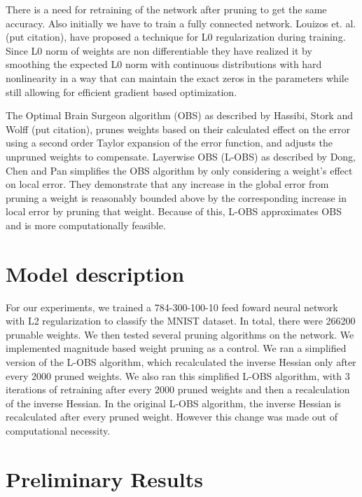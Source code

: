\documentclass{article}
\begin{document}
There is a need for retraining of the network after pruning to get the same accuracy. Also initially we have to train a fully connected network. Louizos et. al.(put citation), have proposed a technique for L0 regularization during training. Since L0 norm of weights are non differentiable they have realized it by smoothing the expected L0 norm with continuous distributions with hard nonlinearity in a way that can maintain the exact zeros in the parameters while still allowing for efficient gradient based optimization. 

The Optimal Brain Surgeon algorithm (OBS) as described by Hassibi, Stork and Wolff (put citation), prunes weights based on their calculated effect on the error using a second order Taylor expansion of the error function, and adjusts the unpruned weights to compensate. Layerwise OBS (L-OBS) as described by Dong, Chen and Pan simplifies the OBS algorithm by only considering a weight's effect on local error. They demonstrate that any increase in the global error from pruning a weight is reasonably bounded above by the corresponding increase in local error by pruning that weight. Because of this, L-OBS approximates OBS and is more computationally feasible.

\section{Model description}
\label{Model description} For our experiments, we trained a 784-300-100-10 feed foward neural network with L2 regularization to classify the MNIST dataset. In total, there were 266200 prunable weights. We then tested several pruning algorithms on the network. We implemented magnitude based weight pruning as a control. We ran a simplified version of the L-OBS algorithm, which recalculated the inverse Hessian only after every 2000 pruned weights. We also ran this simplified L-OBS algorithm, with 3 iterations of retraining after every 2000 pruned weights and then a recalculation of the inverse Hessian. In the original L-OBS algorithm, the inverse Hessian is recalculated after every pruned weight. However this change was made out of computational necessity.

\section{Preliminary Results}
\label{Preliminary Results}
\end{document}
